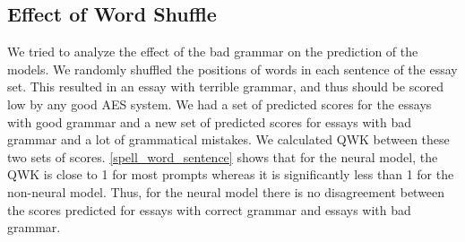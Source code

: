 \documentclass[11pt,a4paper]{article}
\begin{document}

\subsection{Effect of Word Shuffle}
We tried to analyze the effect of the bad grammar on the prediction of the models. We randomly shuffled the positions of words in each sentence of the essay set. This resulted in an essay with terrible grammar, and thus should be scored low by any good AES system. We had a set of predicted scores for the essays with good grammar and a new set of predicted scores for essays with bad grammar and a lot of grammatical mistakes. We calculated QWK between these two sets of scores. \cref{spell_word_sentence} shows that for the neural model, the QWK is close to 1 for most prompts whereas it is significantly less than 1 for the non-neural model. Thus, for the neural model there is no disagreement between the scores predicted for essays with correct grammar and essays with bad grammar.
\end{document}
